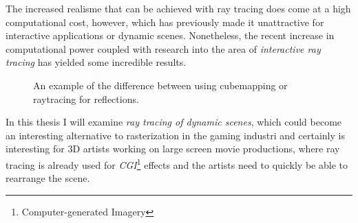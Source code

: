 
The increased realisme that can be achieved with ray tracing does come
at a high computational cost, however, which has previously made it
unattractive for interactive applications or dynamic
scenes. Nonetheless, the recent increase in computational power
coupled with research into the area of \textit{interactive ray
  tracing} has yielded some incredible results.

\begin{figure}
  \centering
  \hspace{10pt}
  \caption[Cubemapping vs raytracing for reflections.]{An example of
    the difference between using cubemapping or raytracing for
    reflections.}
  \label{fig:reflectingDragons}
\end{figure}



In this thesis I will examine \textit{ray tracing of dynamic scenes},
which could become an interesting alternative to rasterization in the
gaming industri and certainly is interesting for 3D artists working on
large screen movie productions, where ray tracing is already used for
\textit{CGI}\footnote{Computer-generated Imagery} effects and the
artists need to quickly be able to rearrange the scene.



